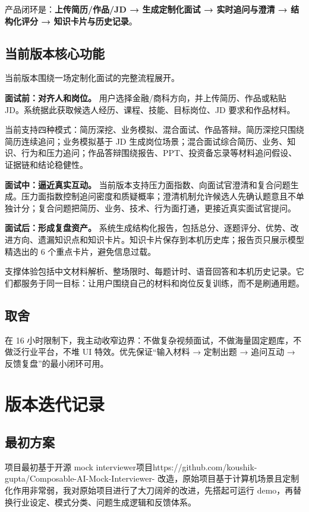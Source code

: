 \documentclass[10pt,a4paper]{ctexart}
\begin{document}
产品闭环是：\textbf{上传简历/作品/JD → 生成定制化面试 → 实时追问与澄清 → 结构化评分 → 知识卡片与历史记录}。

\subsection{当前版本核心功能}

当前版本围绕一场定制化面试的完整流程展开。

\textbf{面试前：对齐人和岗位。} 用户选择金融/商科方向，并上传简历、作品或粘贴 JD。系统据此获取候选人经历、课程、技能、目标岗位、JD 要求和作品材料。

当前支持四种模式：简历深挖、业务模拟、混合面试、作品答辩。简历深挖只围绕简历连续追问；业务模拟基于 JD 生成岗位场景；混合面试综合简历、业务、知识、行为和压力追问；作品答辩围绕报告、PPT、投资备忘录等材料追问假设、证据链和结论稳健性。

\textbf{面试中：逼近真实互动。} 当前版本支持压力面指数、向面试官澄清和复合问题生成。压力面指数控制追问密度和质疑概率；澄清机制允许候选人先确认题意且不单独计分；复合问题把简历、业务、技术、行为面打通，更接近真实面试官提问。

\textbf{面试后：形成复盘资产。} 系统生成结构化报告，包括总分、逐题评分、优势、改进方向、遗漏知识点和知识卡片。知识卡片保存到本机历史库；报告页只展示模型精选出的 6 个重点卡片，避免信息过载。

支撑体验包括中文材料解析、整场限时、每题计时、语音回答和本机历史记录。它们都服务于同一目标：让用户围绕自己的材料和岗位反复训练，而不是刷通用题。

\subsection{取舍}

在 16 小时限制下，我主动收窄边界：不做复杂视频面试，不做海量固定题库，不做泛行业平台，不堆 UI 特效。优先保证“输入材料 → 定制出题 → 追问互动 → 反馈复盘”的最小闭环可用。

\section{版本迭代记录}

\subsection{最初方案}

项目最初基于开源 mock interviewer项目https://github.com/koushik-gupta/Composable-AI-Mock-Interviewer- 改造，原始项目基于计算机场景且定制化作用非常弱，我对原始项目进行了大刀阔斧的改进，先搭起可运行 demo，再替换行业设定、模式分类、问题生成逻辑和反馈体系。
\end{document}
